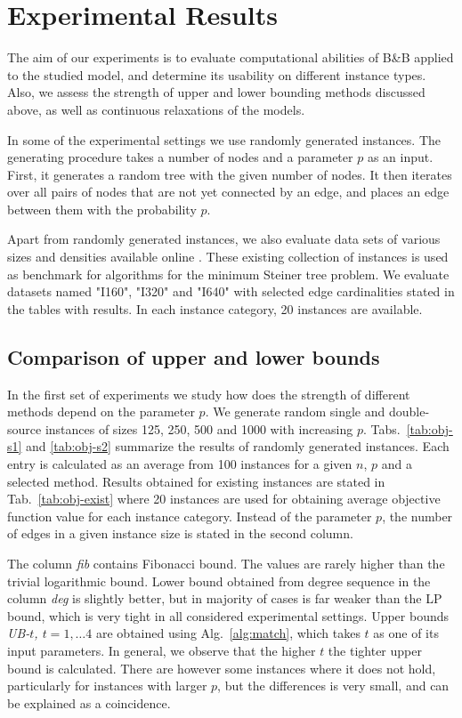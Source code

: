 \section{Experimental Results} \label{sec:exp}

The aim of our experiments is to evaluate computational abilities of B\&B applied to the studied model, and determine its usability on different instance types.
Also, we assess the strength of upper and lower bounding methods discussed above, as well as continuous relaxations of the models.

In some of the experimental settings we use randomly generated instances.
The generating procedure takes a number of nodes and a parameter $p$ as an input.
First, it generates a random tree with the given number of nodes.
It then iterates over all pairs of nodes that are not yet connected by an edge, and places an edge between them with the probability $p$.

Apart from randomly generated instances, we also evaluate data sets of various sizes and densities available online \cite{steinlib}.
These existing collection of instances is used as benchmark for algorithms for the minimum Steiner tree problem.
We evaluate datasets named "I160", "I320" and "I640" with selected edge cardinalities stated in the tables with results. 
In each instance category, 20 instances are available.

\subsection{Comparison of upper and lower bounds}

In the first set of experiments we study how does the strength of different methods depend on the parameter $p$.
We generate random single and double-source instances of sizes 125, 250, 500 and 1000 with increasing $p$.
Tabs.~\ref{tab:obj-s1} and \ref{tab:obj-s2} summarize the results of randomly generated instances.
Each entry is calculated as an average from 100 instances for a given $n$, $p$ and a selected method.
Results obtained for existing instances are stated in Tab.~\ref{tab:obj-exist} where 20 instances are used for obtaining average objective function value for each instance category.
Instead of the parameter $p$, the number of edges in a given instance size is stated in the second column.

The column \emph{fib} contains Fibonacci bound.
The values are rarely higher than the trivial logarithmic bound.
Lower bound obtained from degree sequence in the column \emph{deg} is slightly better, 
but in majority of cases is far weaker than the LP bound, which is very tight in all considered experimental settings.
Upper bounds \emph{UB-$t$, $t=1,\dots 4$} are obtained using Alg.~\ref{alg:match}, which takes $t$ as one of its input parameters.
In general, we observe that the higher $t$ the tighter upper bound is calculated.
There are however some instances where it does not hold, particularly for instances with larger $p$,  but the differences is very small, and can be explained as a coincidence.

